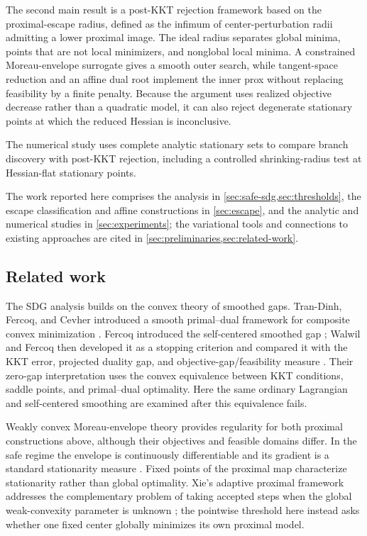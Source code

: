 The second main result is a post-KKT rejection framework based on the
proximal-escape radius, defined as the infimum of center-perturbation radii
admitting a lower proximal image.  The ideal radius separates global minima,
points that are not local minimizers, and nonglobal local minima.  A
constrained Moreau-envelope surrogate gives a smooth outer search, while
tangent-space reduction and an affine dual root implement the inner prox
without replacing feasibility by a finite penalty.  Because the argument uses
realized objective decrease rather than a quadratic model, it can also reject
degenerate stationary points at which the reduced Hessian is inconclusive.

The numerical study uses complete analytic stationary sets to compare branch
discovery with post-KKT rejection, including a controlled shrinking-radius
test at Hessian-flat stationary points.

The work reported here comprises
the analysis in \cref{sec:safe-sdg,sec:thresholds}, the escape classification
and affine constructions in \cref{sec:escape}, and the analytic and numerical
studies in \cref{sec:experiments}; the variational tools and connections to
existing approaches are cited in \cref{sec:preliminaries,sec:related-work}.

\subsection{Related work}
\label{sec:related-work}

The SDG analysis builds on the convex theory of smoothed gaps.
Tran-Dinh, Fercoq, and Cevher introduced a smooth primal--dual framework for
composite convex minimization \cite{TranDinhFercoqCevher2018}.  Fercoq
introduced the self-centered smoothed gap \cite{Fercoq2023}; Walwil and Fercoq
then developed it as a stopping criterion and compared it with the KKT error,
projected duality gap, and objective-gap/feasibility measure
\cite{WalwilFercoq2025}.  Their zero-gap interpretation uses the
convex equivalence between KKT conditions, saddle points, and primal--dual
optimality.  Here the same ordinary Lagrangian and self-centered smoothing are
examined after this equivalence fails.

Weakly convex Moreau-envelope theory provides regularity for both proximal
constructions above, although their objectives and feasible domains differ.
In the safe regime the envelope is continuously differentiable and its
gradient is a standard stationarity measure \cite{DavisDrusvyatskiy2019}.
Fixed points of the proximal map characterize stationarity rather than
global optimality.  Xie's
adaptive proximal framework addresses the
complementary problem of taking accepted steps when the global
weak-convexity parameter is unknown \cite{Xie2026}; the pointwise threshold
here instead asks whether one fixed center globally minimizes its own
proximal model.

